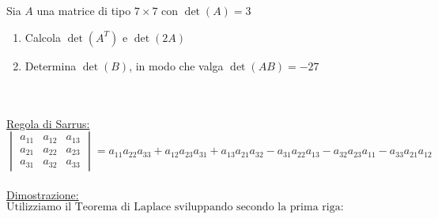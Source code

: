 \documentclass[a4paper,10pt]{article}
\begin{document}




\bigskip



 \\\\
    Sia $A$ una matrice di tipo $7 \times 7$ con $\det(A)=3$
    \begin{enumerate}
        \item Calcola $\det(A^{T})$ e $\det(2A)$
        \item Determina $\det(B)$, in modo che valga $\det(AB) = -27$
    \end{enumerate}



\bigskip



 \\\\
   \underline{Regola di Sarrus:}\\


${\begin{vmatrix} 
a_{11} & a_{12} & a_{13} \\
a_{21} & a_{22} & a_{23} \\
a_{31} & a_{32} & a_{33} 
\end{vmatrix} = a_{11}a_{22}a_{33} + a_{12}a_{23}a_{31} + a_{13}a_{21}a_{32} - a_{31}a_{22}a_{13} - a_{32}a_{23}a_{11}-a_{33}a_{21}a_{12}}$
\\
\\
\underline{Dimostrazione:}
\\

$\text{Utilizziamo il Teorema di Laplace sviluppando secondo la prima riga:}$
\\
\end{document}
